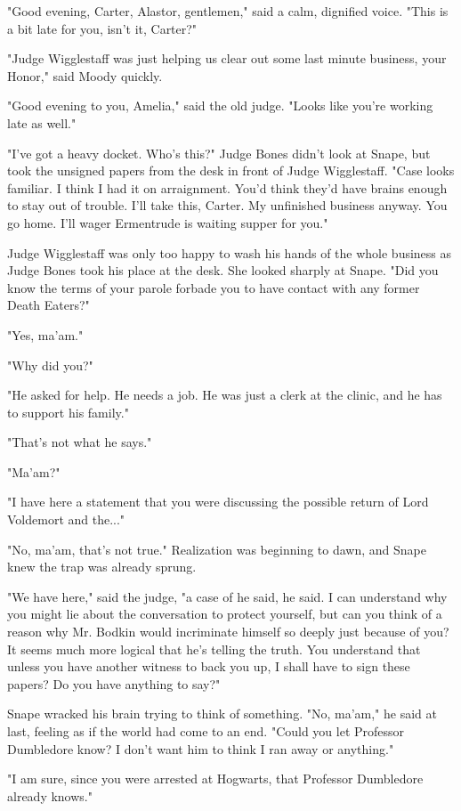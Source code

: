 "Good evening, Carter, Alastor, gentlemen," said a calm, dignified voice. "This is a bit late for you, isn't it, Carter?"

"Judge Wigglestaff was just helping us clear out some last minute business, your Honor," said Moody quickly.

"Good evening to you, Amelia," said the old judge. "Looks like you're working late as well."

"I've got a heavy docket. Who's this?" Judge Bones didn't look at Snape, but took the unsigned papers from the desk in front of Judge Wigglestaff. "Case looks familiar. I think I had it on arraignment. You'd think they'd have brains enough to stay out of trouble. I'll take this, Carter. My unfinished business anyway. You go home. I'll wager Ermentrude is waiting supper for you."

Judge Wigglestaff was only too happy to wash his hands of the whole business as Judge Bones took his place at the desk. She looked sharply at Snape. "Did you know the terms of your parole forbade you to have contact with any former Death Eaters?"

"Yes, ma'am."

"Why did you?"

"He asked for help. He needs a job. He was just a clerk at the clinic, and he has to support his family."

"That's not what he says."

"Ma'am?"

"I have here a statement that you were discussing the possible return of Lord Voldemort and the..."

"No, ma'am, that's not true." Realization was beginning to dawn, and Snape knew the trap was already sprung.

"We have here," said the judge, "a case of he said, he said. I can understand why you might lie about the conversation to protect yourself, but can you think of a reason why Mr. Bodkin would incriminate himself so deeply just because of you? It seems much more logical that he's telling the truth. You understand that unless you have another witness to back you up, I shall have to sign these papers? Do you have anything to say?"

Snape wracked his brain trying to think of something. "No, ma'am," he said at last, feeling as if the world had come to an end. "Could you let Professor Dumbledore know? I don't want him to think I ran away or anything."

"I am sure, since you were arrested at Hogwarts, that Professor Dumbledore already knows."

